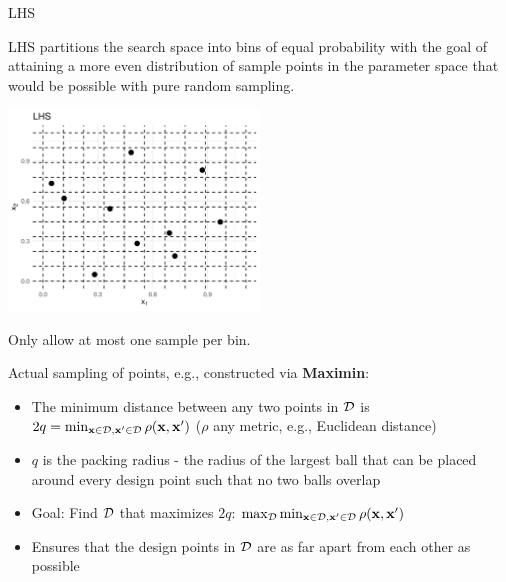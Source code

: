 \documentclass[11pt,compress,t,notes=noshow, xcolor=table]{beamer}
\begin{document}
\begin{vbframe}{LHS}

LHS partitions the search space into bins of equal probability with the goal of attaining a more even distribution of sample points in the parameter space that would be possible with pure random sampling.\\
\vspace{0.45em}
\begin{center}
  \includegraphics[width = 0.5\textwidth]{figure_man/init_1.png}
\end{center}

Only allow at most one sample per bin.

\framebreak

Actual sampling of points, e.g., constructed via \textbf{Maximin}:\\
\begin{itemize}
\item The minimum distance between any two points in $\mathcal{D}$ is $2q = \min_{\mathbf{x} \in \mathcal{D}, \mathbf{x}' \in \mathcal{D}} \rho(\mathbf{x}, \mathbf{x}')$ ($\rho$ any metric, e.g., Euclidean distance)
\item $q$ is the packing radius - the radius of the largest ball that can be placed around every design point such that no two balls overlap
\item Goal: Find $\mathcal{D}$ that maximizes $2q$: $\max_{\mathcal{D}} \min_{\mathbf{x} \in \mathcal{D}, \mathbf{x}' \in \mathcal{D}} \rho(\mathbf{x}, \mathbf{x}')$
\item Ensures that the design points in $\mathcal{D}$ are as far apart from each other as possible
\end{itemize}

\end{vbframe}
\end{document}

